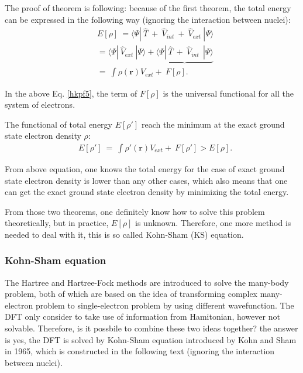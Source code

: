 \documentclass[a4paper, 12pt, titlepage,oneside,drop]{kthesis}
\begin{document}
The proof of theorem is following:
because of the first theorem, the total energy can be expressed in the following way (ignoring the interaction between nuclei):
\begin{equation}\label{hkpf5}\begin{split}
& E[\rho] \ =\langle \Psi  | \ \hat{T} \ + \ \hat{V}_\textit{int}  \ + \ \hat{V}_\textit{ext} \ | \Psi \rangle \\
&     = \langle \Psi  | \ \hat{V}_\textit{ext} \ | \Psi \rangle  + \underbrace{\langle \Psi  | \ \hat{T} \ + \ \hat{V}_\textit{int}  \ \ | \Psi \rangle}  \\
&     =   \ \int \rho(\textbf{r}) V_\textit{ext}  + \                    F[\rho]. 
\end{split}
\end{equation}

In the above Eq. \ref{hkpf5}, the term of $F[\rho]$ is the universal functional for all the system of electrons.

The functional of total energy $E[\rho']$ reach the minimum at the exact ground state electron density $\rho$:
\begin{equation}\begin{split}
 & E[\rho'] \ =   \ \int \rho'(\textbf{r}) V_\textit{ext}  + \  F[\rho'] > E[\rho]. 
\end{split}
\end{equation}
 


From above equation, one knows the total energy for the case of exact ground state electron density is lower than any other cases, which also means that one can get 
the exact ground state electron density by minimizing the total energy.



From those two theorems, one definitely know how to solve this problem theoretically, but in practice, $E[\rho]$ is unknown. 
Therefore, one more method is needed to deal with it, this is so called Kohn-Sham (KS) equation.

\subsubsection{Kohn-Sham equation}

The Hartree and Hartree-Fock methods are introduced to solve the many-body problem, both of which are based on the idea of transforming complex 
many-electron problem to single-electron problem by using different wavefunction. The DFT only consider to take use of information from Hamitonian, however not solvable. 
Therefore, is it possbile to combine these two ideas together? the answer is yes, the DFT is solved by Kohn-Sham equation introduced by Kohn and Sham in 1965,
which is constructed in the following text (ignoring the interaction between nuclei).
\end{document}
